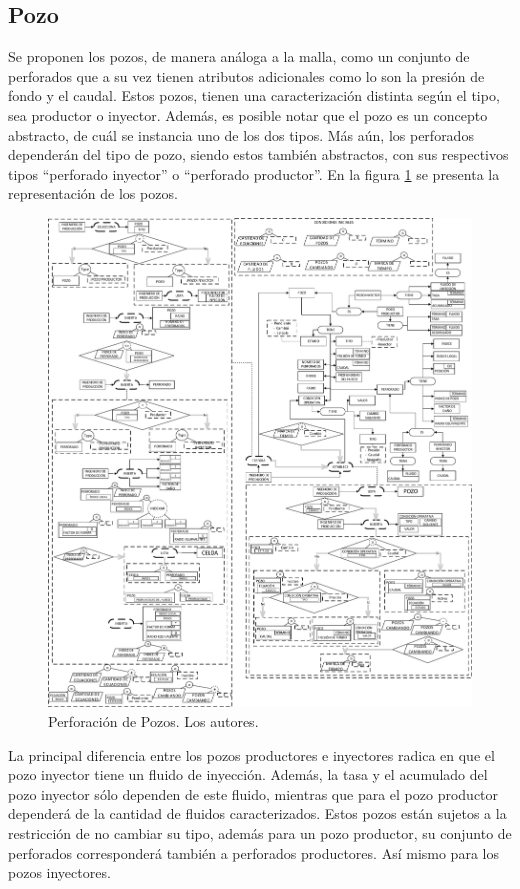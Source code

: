 \subsection{Pozo}\label{sec:PS_Well}
Se proponen los pozos, de manera análoga a la malla, como un conjunto de perforados que a su vez tienen atributos adicionales como lo son la presión de fondo y el caudal. Estos pozos, tienen una caracterización distinta según el tipo, sea productor o inyector. Además, es posible notar que el pozo es un concepto abstracto, de cuál se instancia uno de los dos tipos. Más aún, los perforados dependerán del tipo de pozo, siendo estos también abstractos, con sus respectivos tipos ``perforado inyector'' o ``perforado productor''. En la figura \ref{fig:Well} se presenta la representación de los pozos.\\

\begin{figure}[b]
	\centering%
	\includegraphics[width=0.9\linewidth]{Fig/Pozo.pdf}%
	\caption{Perforación de Pozos. Los autores.} \label{fig:Well}
\end{figure}

La principal diferencia entre los pozos productores e inyectores radica en que el pozo inyector tiene un fluido de inyección. Además, la tasa y el acumulado del pozo inyector sólo dependen de este fluido, mientras que para el pozo productor dependerá de la cantidad de fluidos caracterizados. Estos pozos están sujetos a la restricción de no cambiar su tipo, además para un pozo productor, su conjunto de perforados corresponderá también a perforados productores. Así mismo para los pozos inyectores.\\

